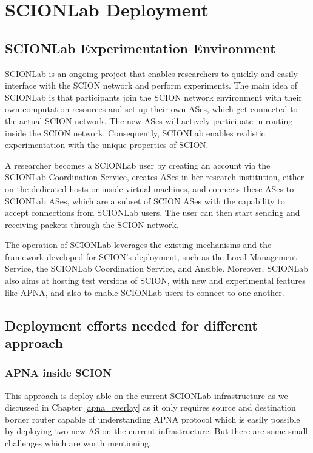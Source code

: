 
\chapter{SCIONLab Deployment} %
\label{scionlab} %

\section{SCIONLab Experimentation Environment}
SCIONLab  is an ongoing project that enables researchers to quickly and easily interface with the SCION network and perform experiments. The main idea of SCIONLab is that participants join the SCION network environment with their own computation resources and set up their own ASes, which get connected to the actual SCION network. The new ASes will actively participate in routing inside the SCION network. Consequently, SCIONLab enables realistic experimentation with the unique properties of SCION.

A researcher becomes a SCIONLab user by creating an account via the SCIONLab Coordination Service, creates ASes in her research institution, either on the dedicated hosts or inside virtual machines, and connects these ASes to SCIONLab ASes, which are a subset of SCION ASes with the capability to accept connections from SCIONLab users. The user can then start sending and receiving packets through the SCION network.

The operation of SCIONLab leverages the existing mechanisms and the framework developed for SCION's deployment, such as the Local Management Service, the SCIONLab Coordination Service, and Ansible. Moreover, SCIONLab also aims at hosting test versions of SCION, with new and experimental features like APNA, and also to enable SCIONLab users to connect to one another.

\section{Deployment efforts needed for different approach}

\subsection{APNA inside SCION}
This approach is deploy-able on the current SCIONLab infrastructure as we discussed in Chapter \ref{apna_overlay} as it only requires source and destination border router capable of understanding APNA protocol which is easily possible by deploying two new AS on the current infrastructure. But there are some small challenges which are worth mentioning.

